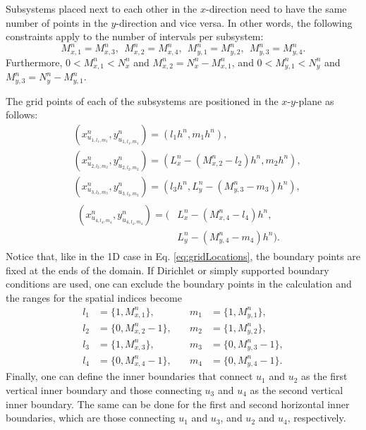 \documentclass[fleqn]{jaes}
\begin{document}
Subsystems placed next to each other in the $x$-direction need to have the same number of points in the $y$-direction and vice versa. In other words, the following constraints apply to the number of intervals per subsystem:
\begin{equation*}
    M_{x, 1}^n = M_{x, 3}^n,\ \ M_{x, 2}^n = M_{x, 4}^n,\ \ M_{y, 1}^n = M_{y, 2}^n,\ \ M_{y, 3}^n = M_{y, 4}^n.
\end{equation*}
Furthermore, $0<M_{x,1}^n<N_x^n$ and $M_{x,2}^n = N_x^n-M_{x,1}^n$, and $0<M_{y,1}^n<N_y^n$ and $M_{y,3}^n = N_y^n-M_{y,1}^n$.

The grid points of each of the subsystems are positioned in the $x$-$y$-plane as follows:%
\begin{subequations}
    \begin{align}
        &\!\!\!\left(x_{u_{1, l_1, m_1}}^n, y_{u_{1, l_1, m_1}}^n\right) = \left(l_1h^n, m_1h^n\right),\\
        &\!\!\!\left(x_{u_{2, l_2, m_2}}^n, y_{u_{2, l_2, m_2}}^n\right) =  \left(L_x^n-(M_{x,2}^n-l_2)h^n, m_2h^n\right),\\
        &\!\!\!\left(x_{u_{3, l_3, m_3}}^n, y_{u_{3, l_3, m_3}}^n\right) = \left(l_3h^n, L_y^n-(M_{y,3}^n-m_3)h^n\right),\\
        &\!\!\!\begin{aligned}\left(x_{u_{4, l_4, m_4}}^n, y_{u_{4, l_4, m_4}}^n\right) =
        \Big(&L_x^n-(M_{x,4}^n-l_4)h^n,\\ \qquad &L_y^n-(M_{y,4}^n-m_4)h^n\Big).\end{aligned}
    \end{align}
\end{subequations}
Notice that, like in the 1D case in Eq. \eqref{eq:gridLocations}, the boundary points are fixed at the ends of the domain. If Dirichlet or simply supported boundary conditions are used, one can exclude the boundary points in the calculation and the ranges for the spatial indices become 
\begin{equation}\label{eq:rangesLM}
    \begin{aligned}
        l_1 &= \{1, M_{x,1}^n\}, &\quad m_1 &= \{1, M_{y,1}^n\}, \\
         l_2 &= \{0, M_{x,2}^n-1\}, &\quad m_2 &= \{1, M_{y,2}^n\},\\
        l_3 &= \{1, M_{x,3}^n\},&\quad m_3 &= \{0, M_{y,3}^n-1\},\\
        l_4 &= \{0, M_{x,4}^n-1\}, &\quad m_4 &= \{0, M_{y,4}^n-1\}.
    \end{aligned}
\end{equation}
Finally, one can define the inner boundaries that connect $u_1$ and $u_2$ as the first vertical inner boundary and those connecting $u_3$ and $u_4$ as the second vertical inner boundary. The same can be done for the first and second horizontal inner boundaries, which are those connecting $u_1$ and $u_3$, and $u_2$ and $u_4$, respectively. 
\end{document}
